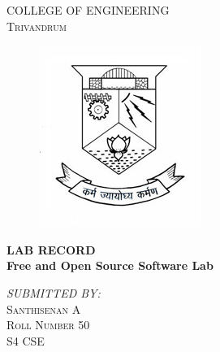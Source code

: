 \documentclass{article}
\newenvironment{bottompar}{\par\vspace*{\fill}}{\clearpage}
\begin{document}
\newcommand{\HRule}{\rule{\linewidth}{0.5mm}} 
\begin{titlepage}

\center

\textsc{\LARGE COLLEGE OF ENGINEERING }\\[1.0 cm]
\textsc{\Large Trivandrum}\\[0.5cm]
\vspace{20px}
\begin{figure}[h!]
     \includegraphics[width=\linewidth]{./logo/cet.jpg}
\end{figure}
\begin{bottompar}
{ \huge \bfseries LAB RECORD}\\[0.4cm] 
{ \large \bfseries Free and Open Source Software Lab}\\[0.4cm] 
\end{bottompar}


\begin{bottompar}
\emph{\small SUBMITTED BY:}\\
\textsc{\Large Santhisenan A \\
 Roll Number 50 \\
 S4 CSE\\
 } 
 \end{bottompar}




\vfill



\end{titlepage}
\newpage
\tableofcontents{}
\end{document}
